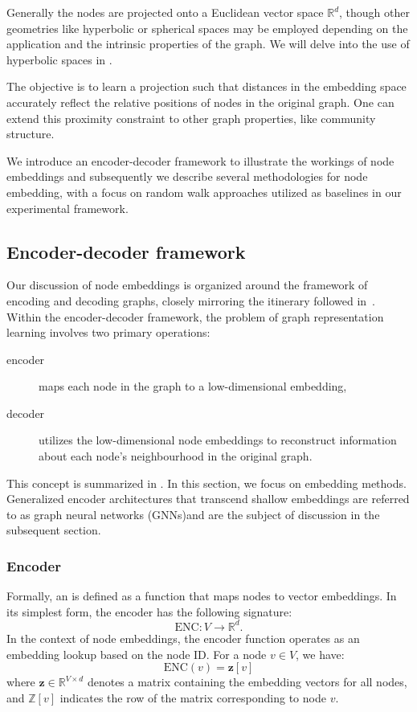 Generally the nodes are projected onto a Euclidean vector space $\mathbb{R}^d$, though other geometries like hyperbolic or spherical spaces may be employed depending on the application and the intrinsic properties of the graph. We will delve into the use of hyperbolic spaces in .

The objective is to learn a projection such that distances in the embedding space accurately reflect the relative positions of nodes in the original graph. One can extend this proximity constraint to other graph properties, like community structure. 


We introduce an encoder-decoder framework to illustrate the workings of node embeddings and subsequently we describe several methodologies for node embedding, with a focus on random walk approaches utilized as baselines in our experimental framework.

\subsection{Encoder-decoder framework}
Our discussion of node embeddings is organized around the framework of encoding and decoding graphs, closely mirroring the itinerary followed in~\cite{Hamilton2020GraphRL}. Within the encoder-decoder framework, the problem of graph representation learning involves two primary operations:
\begin{description}
    \item[encoder] maps each node in the graph to a low-dimensional embedding,
    \item[decoder] utilizes the low-dimensional node embeddings to reconstruct information about each node's neighbourhood in the original graph.
\end{description}
This concept is summarized in . In this section, we focus on  embedding methods. Generalized encoder architectures that transcend shallow embeddings are referred to as graph neural networks (GNNs)and are the subject of discussion in the subsequent section.



\subsubsection{Encoder}
Formally, an  is defined as a function that maps nodes to vector embeddings. In its simplest form, the encoder has the following signature:
\begin{equation*}
    \text{ENC}: V \to \mathbb{R}^d.
\end{equation*}
In the context of  node embeddings, the encoder function operates as an embedding lookup based on the node ID. For a node $ v\in V $, we have:
\begin{equation}\label{eq:encoderLookup}
    \text{ENC}(v) = \mathbf{z}[v]
\end{equation}
where $ \mathbf{z}\in \mathbb{R}^{V\times d} $ denotes a matrix containing the embedding vectors for all nodes, and $ \mathbb{Z}[v] $ indicates the row of the matrix corresponding to node $ v $.

